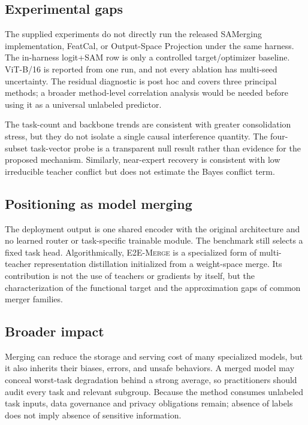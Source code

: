 \documentclass[letterpaper]{article} %
\newcommand{\method}{\textup{\textsc{E2E-Merge}}\xspace}
\theoremstyle{plain}
\theoremstyle{definition}
\begin{document}
\subsection{Experimental gaps}
The supplied experiments do not directly run the released SAMerging implementation,
FeatCal, or Output-Space Projection under the same harness. The in-harness logit+SAM row
is only a controlled target/optimizer baseline. ViT-B/16 is reported from one run, and
not every ablation has multi-seed uncertainty. The residual diagnostic is post hoc and
covers three principal methods; a broader method-level correlation analysis would be
needed before using it as a universal unlabeled predictor.

The task-count and backbone trends are consistent with greater consolidation stress, but
they do not isolate a single causal interference quantity. The four-subset task-vector
probe is a transparent null result rather than evidence for the proposed mechanism.
Similarly, near-expert recovery is consistent with low irreducible teacher conflict but
does not estimate the Bayes conflict term.

\subsection{Positioning as model merging}
The deployment output is one shared encoder with the original architecture and no learned
router or task-specific trainable module. The benchmark still selects a fixed task head.
Algorithmically, \method is a specialized form of multi-teacher representation
distillation initialized from a weight-space merge. Its contribution is not the use of
teachers or gradients by itself, but the characterization of the functional target and
the approximation gaps of common merger families.

\subsection{Broader impact}
Merging can reduce the storage and serving cost of many specialized models, but it also
inherits their biases, errors, and unsafe behaviors. A merged model may conceal
worst-task degradation behind a strong average, so practitioners should audit every task
and relevant subgroup. Because the method consumes unlabeled task inputs, data governance
and privacy obligations remain; absence of labels does not imply absence of sensitive
information.
\end{document}
